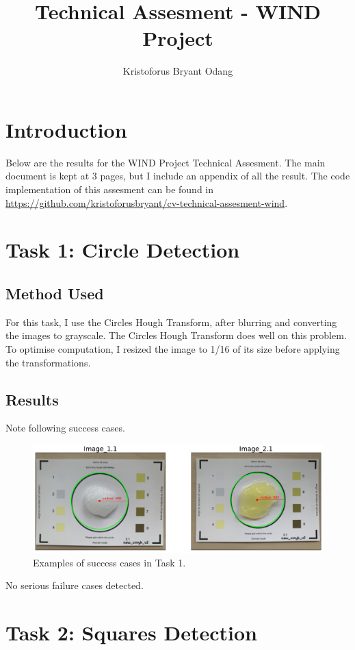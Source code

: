 \documentclass[12pt]{article}
\title{Technical Assesment - WIND Project}
\author{Kristoforus Bryant Odang}
\begin{document}
\maketitle


\section{Introduction}
Below are the results for the WIND Project Technical Assesment. The main document is kept at 3 pages, but I include an appendix of all the result. The code implementation of this assesment can be found in \url{https://github.com/kristoforusbryant/cv-technical-assesment-wind}. 

\section{Task 1: Circle Detection}

\subsection{Method Used}
For this task, I use the Circles Hough Transform, after blurring and converting the images to grayscale. The Circles Hough Transform does well on this problem. To optimise computation, I resized the image to 1/16 of its size before applying the transformations.

\subsection{Results}
Note following success cases.

\begin{figure}[H]
\centerline{\includegraphics[width=.85\textwidth]{figs/task1-success.pdf}} 
	\caption{Examples of success cases in Task 1.}
	\label{fig: task1-success}
\end{figure}
No serious failure cases detected.

\section{Task 2: Squares Detection}
\end{document}
